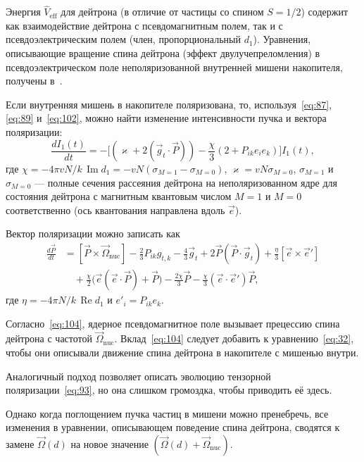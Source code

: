 \documentclass[11pt,a4paper]{article}
\DeclareMathOperator{\Reop}{Re}
\DeclareMathOperator{\Imop}{Im}
\begin{document}
Энергия $\hat{V}_{\mathrm{eff}}$ для дейтрона (в отличие от частицы
со спином $S=1/2$) содержит как взаимодействие дейтрона с псевдомагнитным
полем, так и с псевдоэлектрическим полем (член, пропорциональный $d_1$).
Уравнения, описывающие вращение спина дейтрона (эффект двулучепреломления)
в псевдоэлектрическом поле неполяризованной внутренней мишени накопителя,
получены в~\cite{BaryShirvel05}.

Если внутренняя мишень в накопителе поляризована, то, используя~\eqref{eq:87},
\eqref{eq:89} и~\eqref{eq:102}, можно найти изменение интенсивности пучка
и вектора поляризации:
\begin{equation}
\frac{d I_1(t)}{dt}
=-\Biggl[
(\varkappa+2(\vec{g}_t\cdot\vec{P}))
-\frac{\chi}{3}(2+P_{ik}e_i e_k)
\Biggr]I_1(t),
\label{eq:103}
\end{equation}
где $\chi=-4\pi v N/k\,\Imop d_1=-v N(\sigma_{M=1}-\sigma_{M=0})$,
$\varkappa=v N\sigma_{M=0}$, $\sigma_{M=1}$ и $\sigma_{M=0}$ --- полные
сечения рассеяния дейтрона на неполяризованном ядре для состояния дейтрона
с магнитным квантовым числом $M=1$ и $M=0$ соответственно (ось квантования
направлена вдоль $\vec{e}$).

Вектор поляризации можно записать как
\begin{equation}
\begin{aligned}
\frac{d\vec{P}}{dt}
&=[\vec{P}\times\vec{\Omega}_{\mathrm{nuc}}]
-\frac23 P_{ik}g_{t,k}-\frac43\vec{g}_t+2\vec{P}(\vec{P}\cdot\vec{g}_t)
+\frac{\eta}{3}[\vec{e}\times\vec{e}']
\\
&\quad
+\frac{\chi}{2}\bigl(\vec{e}(\vec{e}\cdot\vec{P})+\vec{P}\bigr)
-\frac{2\chi}{3}\vec{P}
-\frac{\chi}{3}(\vec{e}\cdot\vec{e}')\vec{P},
\end{aligned}
\label{eq:104}
\end{equation}
где $\eta=-4\pi N/k\,\Reop d_1$ и $e'_i=P_{ik}e_k$.

Согласно~\eqref{eq:104}, ядерное псевдомагнитное поле вызывает прецессию
спина дейтрона с частотой $\vec{\Omega}_{\mathrm{nuc}}$. Вклад~\eqref{eq:104}
следует добавить к уравнению~\eqref{eq:32}, чтобы они описывали движение
спина дейтрона в накопителе с мишенью внутри.

Аналогичный подход позволяет описать эволюцию тензорной
поляризации~\eqref{eq:93}, но она слишком громоздка, чтобы приводить её здесь.

Однако когда поглощением пучка частиц в мишени можно пренебречь, все
изменения в уравнении, описывающем поведение спина дейтрона, сводятся
к замене $\vec{\Omega}(d)$ на новое значение
$(\vec{\Omega}(d)+\vec{\Omega}_{\mathrm{nuc}})$.
\end{document}
